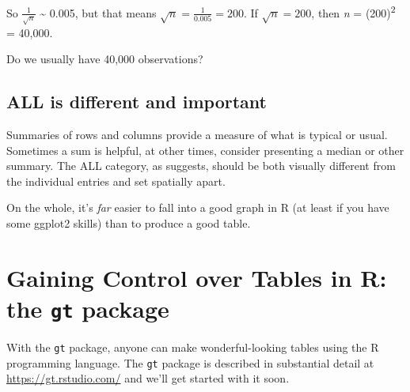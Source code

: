 \documentclass[
]{book}
\begin{document}
So \(\frac{1}{\sqrt{n}}\) \textasciitilde{} 0.005, but that means \(\sqrt{n} = \frac{1}{0.005} = 200\). If \(\sqrt{n} = 200\), then \emph{n} = (200)\textsuperscript{2} = 40,000.

Do we usually have 40,000 observations?

\hypertarget{all-is-different-and-important}{%
\subsection{ALL is different and important}\label{all-is-different-and-important}}

Summaries of rows and columns provide a measure of what is typical or usual. Sometimes a sum is helpful, at other times, consider presenting a median or other summary. The ALL category, as \citet{HW_VisualRevelations} suggests, should be both visually different from the individual entries and set spatially apart.

On the whole, it's \emph{far} easier to fall into a good graph in R (at least if you have some ggplot2 skills) than to produce a good table.

\hypertarget{gaining-control-over-tables-in-r-the-gt-package}{%
\section{\texorpdfstring{Gaining Control over Tables in R: the \texttt{gt} package}{Gaining Control over Tables in R: the gt package}}\label{gaining-control-over-tables-in-r-the-gt-package}}

With the \texttt{gt} package, anyone can make wonderful-looking tables using the R programming language. The \texttt{gt} package is described in substantial detail at \url{https://gt.rstudio.com/} and we'll get started with it soon.

  
\end{document}
